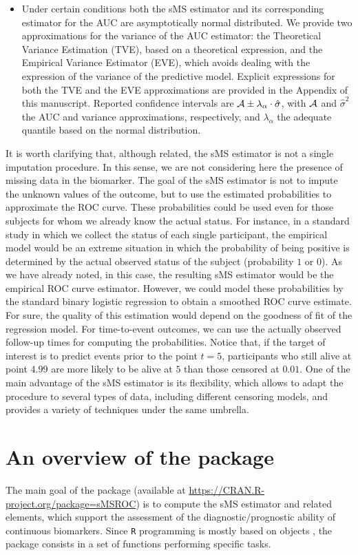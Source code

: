 \begin {itemize}
\item{Under certain conditions both the sMS estimator and its corresponding estimator for the AUC are asymptotically normal distributed. We provide two approximations for the variance of the AUC estimator: the Theoretical Variance Estimation (TVE), based on a theoretical expression, and the Empirical Variance Estimator (EVE), which avoids dealing with the expression of the variance of the predictive model. Explicit expressions for both the TVE and the EVE approximations are provided in the Appendix of this manuscript. Reported confidence intervals are ${\cal A}\pm\lambda_{\alpha}\cdot\hat \sigma$, with ${\cal A}$ and $\hat\sigma^2$ the AUC and variance approximations, respectively, and $\lambda_\alpha$ the adequate quantile based on the normal distribution.}
\end{itemize}

It is worth clarifying that, although related, the sMS estimator is not a single imputation procedure. In this sense, we are not considering here the presence of missing data in the biomarker. The goal of the sMS estimator is not to impute the unknown values of the outcome, but to use the estimated probabilities to approximate the ROC curve. These probabilities could be used even for those subjects for whom we already know the actual status. For instance, in a standard study in which we collect the status of each single participant, the empirical model would be an extreme situation in which the probability of being positive is determined by the actual observed status of the subject (probability $1$ or $0$). As we have already noted, in this case, the resulting sMS estimator would be the empirical ROC curve estimator. However, we could model these probabilities by the standard binary logistic regression to obtain a smoothed ROC curve estimate. For sure, the quality of this estimation would depend on the goodness of fit of the regression model. For time-to-event outcomes, we can use the actually observed follow-up times for computing the probabilities. Notice that, if the target of interest is to predict events prior to the point $t=5$, participants who still alive at point $4.99$ are more likely to be alive at $5$ than those censored at $0.01$. One of the main advantage of the sMS estimator is its flexibility, which allows to adapt the procedure to several types of data, including different censoring models, and provides a variety of techniques under the same umbrella.

\section{An overview of the package}
The main goal of the  package (available at \url{https://CRAN.R-project.org/package=sMSROC}) 
is to compute the sMS estimator and related elements, which support the assessment of the diagnostic/prognostic ability of continuous biomarkers. Since \texttt{R} programming is mostly based on objects \citep{Monica2014}, the  package consists in a set of functions performing specific tasks.

